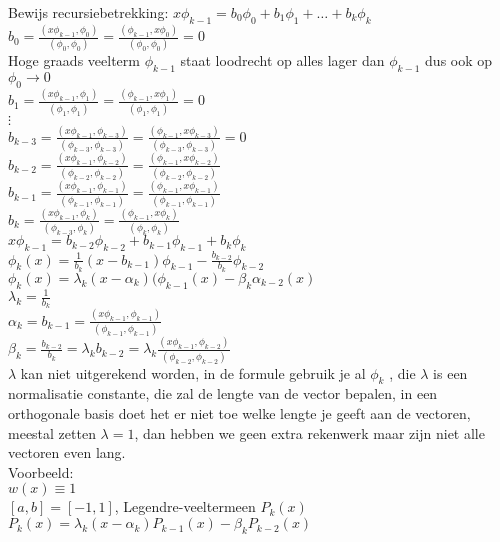 \begin{enumerate}
\begin{enumerate}
Bewijs recursiebetrekking:
$x \phi_{k-1}= b_0\phi_0 + b_1 \phi_1 + \ldots + b_k \phi_k $ \\
$b_0 = \frac{(x\phi_{k-1},\phi_0)}{(\phi_0,\phi_0)} = \frac{(\phi_{k-1},x\phi_0)}{(\phi_0,\phi_0)}=0$ \\
Hoge graads veelterm $\phi_{k-1}$ staat loodrecht op alles lager dan $\phi_{k-1}$ dus ook op $\phi_0 \rightarrow 0$ \\
$b_1 = \frac{(x\phi_{k-1},\phi_1)}{(\phi_1,\phi_1)} = \frac{(\phi_{k-1},x\phi_1)}{(\phi_1,\phi_1)}=0$ \\
$\vdots$\\
$b_{k-3} = \frac{(x\phi_{k-1},\phi_{k-3})}{(\phi_{k-3},\phi_{k-3})} = \frac{(\phi_{k-1},x\phi_{k-3})}{(\phi_{k-3},\phi_{k-3})}=0$ \\
$b_{k-2} = \frac{(x\phi_{k-1},\phi_{k-2})}{(\phi_{k-2},\phi_{k-2})} = \frac{(\phi_{k-1},x\phi_{k-2})}{(\phi_{k-2},\phi_{k-2})}$ \\
$b_{k-1} = \frac{(x\phi_{k-1},\phi_{k-1})}{(\phi_{k-1},\phi_{k-1})} = \frac{(\phi_{k-1},x\phi_{k-1})}{(\phi_{k-1},\phi_{k-1})}$ \\
$b_{k} = \frac{(x\phi_{k-1},\phi_{k})}{(\phi_{k-3},\phi_{k})} = \frac{(\phi_{k-1},x\phi_{k})}{(\phi_{k},\phi_{k})}$ \\
$x \phi_{k-1}= b_{k-2}\phi_{k-2} + b_{k-1}\phi_{k-1} +b_{k}\phi_{k} $ \\

$\phi_k(x)= \frac{1}{b_k}(x-b_{k-1})\phi_{k-1}-\frac{b_{k-2}}{b_k}\phi_{k-2}$ \\

$\phi_k(x) = \lambda_k(x-\alpha_k)(\phi_{k-1}(x)-\beta_k\alpha_{k-2}(x)$ \\
$\lambda_k= \frac{1}{b_k}$ \\
$\alpha_k = b_{k-1} = \frac{(x\phi_{k-1},\phi_{k-1})}{(\phi_{k-1},\phi_{k-1})}$ \\
$\beta_k = \frac{b_{k-2}}{b_k} = \lambda_k b_{k-2} = \lambda_k \frac{(x\phi_{k-1},\phi_{k-2})}{(\phi_{k-2},\phi_{k-2})}$ \\
$\lambda$ kan niet  uitgerekend worden, in de formule gebruik je al $\phi_k$ , die $\lambda$ is een normalisatie constante, die zal de lengte van de vector bepalen, in een orthogonale basis doet het er niet toe welke lengte je geeft aan de vectoren, meestal zetten $\lambda=1$, dan hebben we geen extra rekenwerk maar zijn niet alle vectoren even lang. \\
Voorbeeld: \\
$w(x) \equiv 1$ \\
$[a,b]=[-1,1]$, Legendre-veeltermeen $P_k(x)$ \\
$P_k(x)= \lambda_k (x-\alpha_k)P_{k-1}(x)-\beta_kP_{k-2}(x)$ \\


\end{enumerate}
\end{enumerate}

